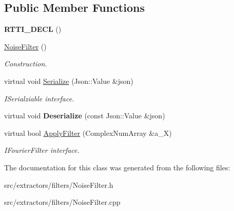 \subsection*{Public Member Functions}
\begin{DoxyCompactItemize}
\item 
\mbox{\label{class_noise_filter_a3bad4304c1e6a18eeb634ee23b591d17}} 
{\bfseries R\+T\+T\+I\+\_\+\+D\+E\+CL} ()
\item 
\mbox{\label{class_noise_filter_a0f9898ebd48dbb5db6d58c5373a91fc5}} 
\hyperlink{class_noise_filter_a0f9898ebd48dbb5db6d58c5373a91fc5}{Noise\+Filter} ()
\begin{DoxyCompactList}\small\item\em Construction. \end{DoxyCompactList}\item 
\mbox{\label{class_noise_filter_af82665e8d05322af29c2a1074e990804}} 
virtual void \hyperlink{class_noise_filter_af82665e8d05322af29c2a1074e990804}{Serialize} (Json\+::\+Value \&json)
\begin{DoxyCompactList}\small\item\em I\+Serialziable interface. \end{DoxyCompactList}\item 
\mbox{\label{class_noise_filter_a5804c75bc1da3d00e4476d9bf43dcfbf}} 
virtual void {\bfseries Deserialize} (const Json\+::\+Value \&json)
\item 
\mbox{\label{class_noise_filter_af34c060518525acbd9ced9520938a969}} 
virtual bool \hyperlink{class_noise_filter_af34c060518525acbd9ced9520938a969}{Apply\+Filter} (Complex\+Num\+Array \&a\+\_\+X)
\begin{DoxyCompactList}\small\item\em I\+Fourier\+Filter interface. \end{DoxyCompactList}\end{DoxyCompactItemize}


The documentation for this class was generated from the following files\+:\begin{DoxyCompactItemize}
\item 
src/extractors/filters/Noise\+Filter.\+h\item 
src/extractors/filters/Noise\+Filter.\+cpp\end{DoxyCompactItemize}
